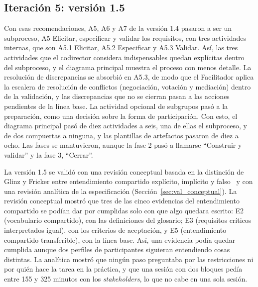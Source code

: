 \documentclass[12pt,letterpaper,oneside]{report}
\begin{document}
\subsection{Iteración 5: versión 1.5}
\label{sec:v15}
Con esas recomendaciones, A5, A6 y A7 de la versión 1.4 pasaron a ser un
subproceso, A5 Elicitar, especificar y validar los requisitos, con tres
actividades internas, que son A5.1 Elicitar, A5.2 Especificar y A5.3 Validar.
Así, las tres actividades que el codirector considera indispensables quedan
explícitas dentro del subproceso, y el diagrama principal muestra el proceso con
menos detalle.
La resolución de discrepancias se absorbió en A5.3, de modo que el Facilitador
aplica la escalera de resolución de conflictos (negociación, votación y mediación) dentro de la validación,
y las discrepancias que no se cierran pasan a las acciones pendientes de la
línea base. La actividad opcional de subgrupos pasó a la preparación, como una
decisión sobre la forma de participación. Con esto, el diagrama principal pasó
de diez actividades a seis, una de ellas el subproceso, y de dos compuertas a
ninguna, y las plantillas de artefactos pasaron de diez a ocho. Las fases se
mantuvieron, aunque la fase 2 pasó a llamarse ``Construir y validar'' y la fase
3, ``Cerrar''.

La versión 1.5 se validó con una revisión conceptual basada en la distinción de
Glinz y Fricker entre entendimiento compartido explícito, implícito y
falso~\cite{glinz2015shared} y con una revisión analítica de la especificación
(Sección~\ref{sec:val_conceptual}).
La revisión conceptual mostró que tres de las cinco evidencias del entendimiento
compartido se podían dar por cumplidas solo con que algo quedara escrito: E2
(vocabulario compartido), con las definiciones del glosario; E3 (requisitos
críticos interpretados igual), con los criterios de aceptación, y E5
(entendimiento compartido transferible), con la línea base. Así, una evidencia
podía quedar cumplida aunque dos perfiles de participantes siguieran entendiendo
cosas distintas. La analítica mostró
que ningún paso preguntaba por las restricciones ni por quién hace la tarea en la práctica, y
que una sesión con dos bloques pedía entre 155 y 325 minutos con los
\textit{stakeholders}, lo que no cabe en una sola sesión.
\end{document}
